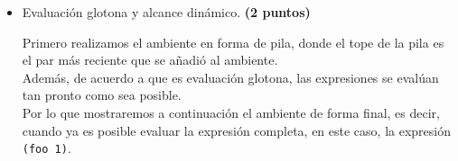 \documentclass[11pt]{article}
\begin{document}
\begin{enumerate}[leftmargin=0.8cm]
\begin{itemize}
        \item Evaluación glotona y alcance dinámico. \textbf{(2 puntos)}
        
        Primero realizamos el ambiente en forma de pila, donde el tope de la pila es el par más reciente que se añadió al ambiente.\\
        Además, de acuerdo a que es evaluación glotona, las expresiones se evalúan tan pronto como sea posible.\\
        Por lo que mostraremos a continuación el ambiente de forma final, es decir, cuando ya es posible evaluar la expresión completa, en este caso, la expresión \texttt{(foo 1)}.\\
        \begin{center}
            
        \end{center}


\end{itemize}
\end{enumerate}
\end{document}
